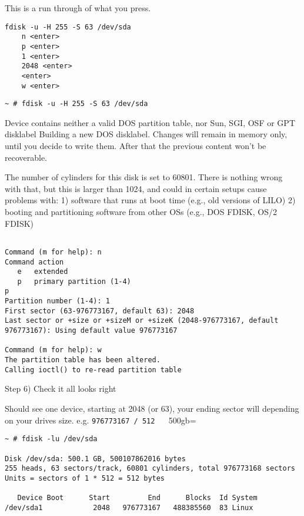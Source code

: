 \begin{itemize}
This is a run through of what you press.

\begin{verbatim}
fdisk -u -H 255 -S 63 /dev/sda
	n <enter>
	p <enter>
	1 <enter>
	2048 <enter>
	<enter>
	w <enter>
\end{verbatim}

\begin{verbatim}
~ # fdisk -u -H 255 -S 63 /dev/sda
\end{verbatim}

Device contains neither a valid DOS partition table, nor Sun, SGI, OSF or GPT disklabel
Building a new DOS disklabel. Changes will remain in memory only,
until you decide to write them. After that the previous content
won't be recoverable.


The number of cylinders for this disk is set to 60801.
There is nothing wrong with that, but this is larger than 1024,
and could in certain setups cause problems with:
1) software that runs at boot time (e.g., old versions of LILO)
2) booting and partitioning software from other OSs
   (e.g., DOS FDISK, OS/2 FDISK)
   
\begin{verbatim}

Command (m for help): n
Command action
   e   extended
   p   primary partition (1-4)
p
Partition number (1-4): 1
First sector (63-976773167, default 63): 2048
Last sector or +size or +sizeM or +sizeK (2048-976773167, default 976773167): Using default value 976773167

Command (m for help): w
The partition table has been altered.
Calling ioctl() to re-read partition table

\end{verbatim}

Step 6) Check it all looks right

Should see one device, starting at 2048 (or 63), your ending sector will depending on your drives size. e.g. \verb=976773167 / 512 = ~ 500gb=

\begin{verbatim}
~ # fdisk -lu /dev/sda

Disk /dev/sda: 500.1 GB, 500107862016 bytes
255 heads, 63 sectors/track, 60801 cylinders, total 976773168 sectors
Units = sectors of 1 * 512 = 512 bytes

   Device Boot      Start         End      Blocks  Id System
/dev/sda1            2048   976773167   488385560  83 Linux
\end{verbatim}


\end{itemize}

